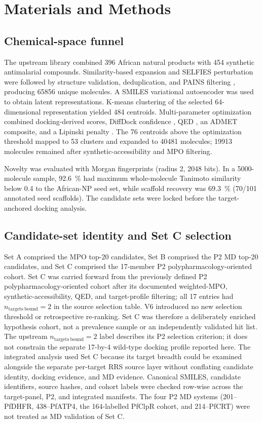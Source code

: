 \documentclass[journal=jcisd8,manuscript=article]{achemso}
\begin{document}
\section{Materials and Methods}
\subsection{Chemical-space funnel}
The upstream library combined \num{396} African natural products with \num{454} synthetic antimalarial compounds. Similarity-based expansion and SELFIES perturbation \cite{Nigam2021,Krenn2020} were followed by structure validation, deduplication, and PAINS filtering \cite{Baell2010}, producing \num{65856} unique molecules. A SMILES variational autoencoder \cite{Kingma2013} was used to obtain latent representations. K-means clustering of the selected 64-dimensional representation yielded \num{484} centroids. Multi-parameter optimization combined docking-derived scores, DiffDock confidence \cite{Corso2023}, QED \cite{Bickerton2012}, an ADMET composite, and a Lipinski penalty \cite{Lipinski2004}. The \num{76} centroids above the optimization threshold mapped to \num{53} clusters and expanded to \num{40481} molecules; \num{19913} molecules remained after synthetic-accessibility and MPO filtering.

Novelty was evaluated with Morgan fingerprints \cite{Rogers2010} (radius \num{2}, \num{2048} bits). In a \num{5000}-molecule sample, \qty{92.6}{\percent} had maximum whole-molecule Tanimoto similarity below \num{0.4} to the African-NP seed set, while scaffold recovery was \qty{69.3}{\percent} (\num{70}/\num{101} annotated seed scaffolds). The candidate sets were locked before the target-anchored docking analysis.

\subsection{Candidate-set identity and Set C selection}
Set A comprised the MPO top-20 candidates, Set B comprised the P2 MD top-20 candidates, and Set C comprised the 17-member P2 polypharmacology-oriented cohort. Set C was carried forward from the previously defined P2 polypharmacology-oriented cohort after its documented weighted-MPO, synthetic-accessibility, QED, and target-profile filtering; all 17 entries had $n_{\mathrm{targets\ bound}}=2$ in the source selection table. V6 introduced no new selection threshold or retrospective re-ranking. Set C was therefore a deliberately enriched hypothesis cohort, not a prevalence sample or an independently validated hit list. The upstream $n_{\mathrm{targets\ bound}}=2$ label describes its P2 selection criterion; it does not constrain the separate 17-by-4 wild-type docking profile reported here. The integrated analysis used Set C because its target breadth could be examined alongside the separate per-target RRS source layer without conflating candidate identity, docking evidence, and MD evidence. Canonical SMILES, candidate identifiers, source hashes, and cohort labels were checked row-wise across the target-panel, P2, and integrated manifests. The four P2 MD systems (201--PfDHFR, 438--PfATP4, the 164-labelled PfClpR cohort, and 214--PfCRT) were not treated as MD validation of Set C.
\end{document}
